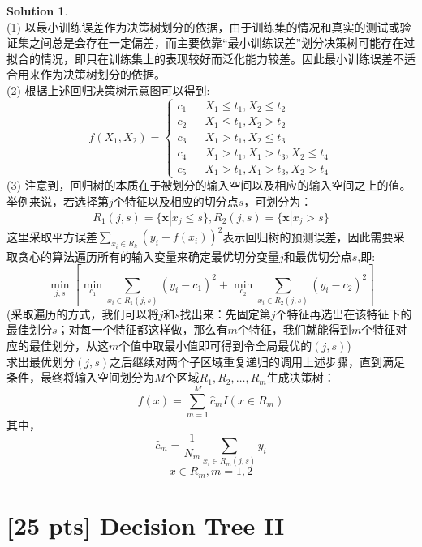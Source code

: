 \documentclass[a4paper,UTF8]{article}
\theoremstyle{definition}
\newtheorem*{solution}{Solution}
\begin{document}
\begin{solution}
~\\(1) 以最小训练误差作为决策树划分的依据，由于训练集的情况和真实的测试或验证集之间总是会存在一定偏差，而主要依靠“最小训练误差”划分决策树可能存在过拟合的情况，即只在训练集上的表现较好而泛化能力较差。因此最小训练误差不适合用来作为决策树划分的依据。
\\ (2) 根据上述回归决策树示意图可以得到:
\begin{equation}\nonumber
f(X_1, X_2)=\left\{
\begin{array}{rcl}
c_1 & & {X_1 \leq t_1, X_2 \leq t_2}\\
c_2 & & {X_1 \leq t_1, X_2 > t_2}\\
c_3 & & {X_1 > t_1, X_2 \leq t_3}\\
c_4 & & {X_1 > t_1, X_1 > t_3, X_2 \leq t_4}\\
c_5 & & {X_1 > t_1, X_1 > t_3, X_2 > t_4}
\end{array} \right.
\end{equation}
(3) 注意到，回归树的本质在于被划分的输入空间以及相应的输入空间之上的值。举例来说，若选择第$j$个特征以及相应的切分点$s$，可划分为：
$$R_1(j,s)=\{\boldsymbol{x}|x_j\leq s\},R_2(j,s)=\{\boldsymbol{x}|x_j>s\}$$
这里采取平方误差$\sum\limits_{x_i\in R_k} (y_i-f(x_i))^2$表示回归树的预测误差，因此需要采取贪心的算法遍历所有的输入变量来确定最优切分变量$j$和最优切分点$s$,即:
$$\min _{j, s}\left[\min _{c_1} \sum_{x_{i} \in R_{1}(j, s)}\left(y_{i}-c_{1}\right)^{2}+\min _{c_{2}} \sum_{x_{i} \in R_{2}(j, s)}\left(y_{i}-c_{2}\right)^{2}\right]$$
(采取遍历的方式，我们可以将$j$和$s$找出来：先固定第$j$个特征再选出在该特征下的最佳划分$s$；对每一个特征都这样做，那么有$m$个特征，我们就能得到$m$个特征对应的最佳划分，从这$m$个值中取最小值即可得到令全局最优的$(j,s)$)\\
求出最优划分$(j,s)$之后继续对两个子区域重复递归的调用上述步骤，直到满足条件，最终将输入空间划分为$M$个区域$R_1,R_2,\dots,R_m$生成决策树：
$$f(x) = \sum_{m=1}^M \hat{c}_m I(x\in R_m)$$
其中，$$\hat{c}_m = \frac{1}{N_m}\sum_{x_i\in R_m(j,s)} y_i$$
$$x\in R_m, m=1,2$$	
\end{solution}

\section{[25 pts] Decision Tree II}
\end{document}

